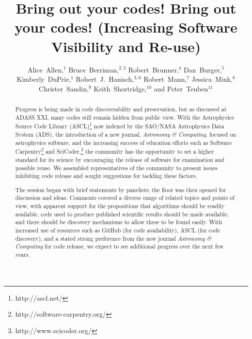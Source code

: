
\resetcounters


\title{Bring out your codes! Bring out your codes! (Increasing Software Visibility and Re-use)}
\author{Alice~Allen,$^1$ Bruce~Berriman,$^{2,3}$ 
Robert~Brunner,$^4$ Dan~Burger,$^5$ Kimberly~DuPrie,$^1$ Robert~J.~Hanisch,$^{3,6}$ Robert~Mann,$^7$ Jessica~Mink,$^8$ Christer~Sandin,$^9$ Keith~Shortridge,$^{10}$ and Peter~Teuben$^{11}$
}


\begin{abstract}

Progress is being made in code discoverability and preservation, but as discussed at ADASS XXI, many codes still remain hidden from public view. With the Astrophysics Source Code Library (ASCL)\footnote{http://ascl.net/} now indexed by the SAO/NASA Astrophysics Data System (ADS), the introduction of a new journal, {\em Astronomy \& Computing}, focused on astrophysics software, and the increasing success of education efforts such as Software Carpentry\footnote{http://software-carpentry.org/} and SciCoder,\footnote{http://www.scicoder.org/} the community has the opportunity to set a higher standard for its science by encouraging the release of software for examination and possible reuse. We assembled representatives of the community to present issues inhibiting code release and sought suggestions for tackling these factors.

The session began with brief statements by panelists; the floor was then opened for discussion and ideas. Comments covered a diverse range of related topics and points of view, with apparent support for the propositions that algorithms should be readily available, code used to produce published scientific results should be made available, and there should be discovery mechanisms to allow these to be found easily. With increased use of resources such as GitHub (for code availability), ASCL (for code discovery), and a stated strong preference from the new journal {\em Astronomy \& Computing} for code release, we expect to see additional progress over the next few years.
\end{abstract}

